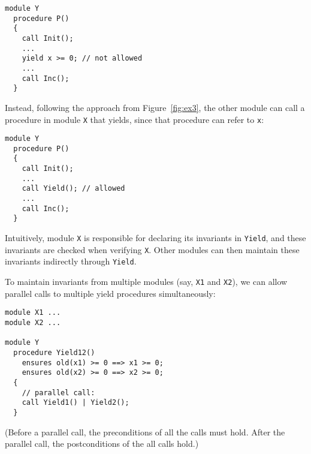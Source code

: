 \begin{verbatim}
module Y
  procedure P()
  {
    call Init();
    ...
    yield x >= 0; // not allowed
    ...
    call Inc();
  }
\end{verbatim}

\noindent
Instead, following the approach from Figure~\ref{fig:ex3},
the other module can call a procedure in module \verb`X` that yields,
since that procedure can refer to \verb`x`:

\begin{verbatim}
module Y
  procedure P()
  {
    call Init();
    ...
    call Yield(); // allowed
    ...
    call Inc();
  }
\end{verbatim}

\noindent
Intuitively, module \verb`X` is responsible for declaring its invariants in \verb`Yield`,
and these invariants are checked when verifying \verb`X`.
Other modules can then maintain these invariants indirectly through \verb`Yield`.

To maintain invariants from multiple modules (say, \verb`X1` and \verb`X2`),
we can allow parallel calls to multiple yield procedures simultaneously:

\begin{verbatim}
module X1 ...
module X2 ...

module Y
  procedure Yield12()
    ensures old(x1) >= 0 ==> x1 >= 0;
    ensures old(x2) >= 0 ==> x2 >= 0;
  {
    // parallel call:
    call Yield1() | Yield2();
  }
\end{verbatim}

\noindent
(Before a parallel call, the preconditions of all the calls must hold.
After the parallel call, the postconditions of the all calls hold.)

